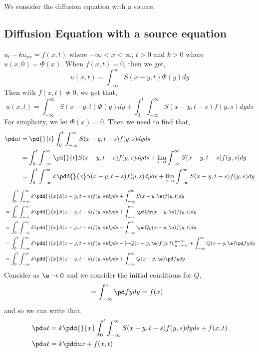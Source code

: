 
\noindent
We consider the diffusion equation with a source,
\subsection{Diffusion Equation with a source equation}
$u_t - ku_{xx} = f(x, t)$ where $-\infty < x < \infty$, $t > 0$ and $k > 0$ where $u(x, 0) = \Phi(x)$. When $f(x, t) = 0$, then we get,
$$ u(x, t) = \int_{-\infty}^\infty S(x - y, t)\Phi(y)dy $$
Then with $f(x, t) \ne 0$, we get that,
$$ u(x, t) = \int_{-\infty}^\infty S(x - y, t)\Phi(y)dy + \int_0^t \int_{-\infty}^\infty S(x - y, t - s)f(y, s)dyds$$
For simplicity, we let $\Phi(x) = 0$. Then we need to find that,
\begin{align*}
  \pd u t &= \pd{}{t}\int_0^t \int_{-\infty}^{\infty} S(x - y, t - s)f(y, s)dyds\\
  &= \int_0^t \int_{-\infty}^{\infty} \pd{}{t}S(x - y, t - s)f(y, s)dyds + \lim_{s \to t}\int_{-\infty}^\infty S(x - y, t - s)f(y, s)dy\\
  &= \int_0^t \int_{-\infty}^\infty k\pdd{}{x}S(x - y, t - s)f(y,s)dyds + \lim_{s \to t}\int_{-\infty}^\infty S(x - y, t - s)f(y, s)dy
\end{align*}
\begin{align*}
  &= \int_0^t \int_{-\infty}^\infty k\pdd{}{x}S(x - y, t - s)f(y,s)dyds + \int_{-\infty}^\infty S(x - y, \e)f(y, t)dy \\
  &= \int_0^t \int_{-\infty}^\infty k\pdd{}{x}S(x - y, t - s)f(y,s)dyds + \int_{-\infty}^\infty \pd Q x(x - y, \e)f(y, t)dy \\
  &= \int_0^t \int_{-\infty}^\infty k\pdd{}{x}S(x - y, t - s)f(y,s)dyds - \int_{-\infty}^\infty \pd Q y(x - y, \e)f(y, t)dy \\
  &= \int_0^t \int_{-\infty}^\infty k\pdd{}{x}S(x - y, t - s)f(y,s)dyds -\left[ - Q(x - y, \e)f(y, t) \right]_{y = -\infty}^{y = \infty} + \int_{-\infty}^\infty Q(x - y, \e)\pd f ydy \\
  &= \int_0^t \int_{-\infty}^\infty k\pdd{}{x}S(x - y, t - s)f(y,s)dyds + \int_{-\infty}^\infty Q(x - y, \e)\pd f y dy \\
\end{align*}
\noindent
Consider as $\e \to 0$ and we consider the initial conditions for $Q$,
\begin{align*}
  &= \int_{-\infty}^x \pd f y dy = f(x)
\end{align*}
and so we can write that,
\begin{align*}
  \pd u t &= k\pdd{}{x}\int_0^t \int_{-\infty}^\infty S(x - y, t - s)f(y, s)dyds + f(x, t) \\
  \pd u t &= k\pdd u x + f(x, t)
\end{align*}
